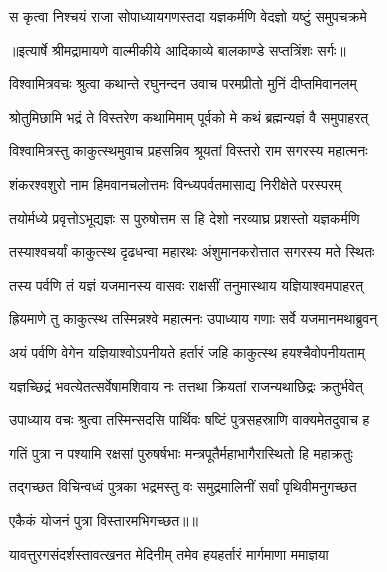 \twolineshloka
{स कृत्वा निश्चयं राजा सोपाध्यायगणस्तदा}
{यज्ञकर्मणि वेदज्ञो यष्टुं समुपचक्रमे} %


{॥इत्यार्षे श्रीमद्रामायणे वाल्मीकीये आदिकाव्ये बालकाण्डे सप्तत्रिंशः सर्गः॥}


\twolineshloka
{विश्वामित्रवचः श्रुत्वा कथान्ते रघुनन्दन}
{उवाच परमप्रीतो मुनिं दीप्तमिवानलम्} %

\twolineshloka
{श्रोतुमिछामि भद्रं ते विस्तरेण कथामिमाम्}
{पूर्वको मे कथं ब्रह्मन्यज्ञं वै समुपाहरत्} %

\twolineshloka
{विश्वामित्रस्तु काकुत्स्थमुवाच प्रहसन्निव}
{श्रूयतां विस्तरो राम सगरस्य महात्मनः} %

\twolineshloka
{शंकरश्वशुरो नाम हिमवानचलोत्तमः}
{विन्ध्यपर्वतमासाद्य निरीक्षेते परस्परम्} %

\twolineshloka
{तयोर्मध्ये प्रवृत्तोऽभूद्यज्ञः स पुरुषोत्तम}
{स हि देशो नरव्याघ्र प्रशस्तो यज्ञकर्मणि} %

\twolineshloka
{तस्याश्वचर्यां काकुत्स्थ दृढधन्वा महारथः}
{अंशुमानकरोत्तात सगरस्य मते स्थितः} %

\twolineshloka
{तस्य पर्वणि तं यज्ञं यजमानस्य वासवः}
{राक्षसीं तनुमास्थाय यज्ञियाश्वमपाहरत्} %

\twolineshloka
{ह्रियमाणे तु काकुत्स्थ तस्मिन्नश्वे महात्मनः}
{उपाध्याय गणाः सर्वे यजमानमथाब्रुवन्} %

\twolineshloka
{अयं पर्वणि वेगेन यज्ञियाश्वोऽपनीयते}
{हर्तारं जहि काकुत्स्थ हयश्चैवोपनीयताम्} %

\twolineshloka
{यज्ञच्छिद्रं भवत्येतत्सर्वेषामशिवाय नः}
{तत्तथा क्रियतां राजन्यथाछिद्रः क्रतुर्भवेत्} %

\twolineshloka
{उपाध्याय वचः श्रुत्वा तस्मिन्सदसि पार्थिवः}
{षष्टिं पुत्रसहस्राणि वाक्यमेतदुवाच ह} %

\twolineshloka
{गतिं पुत्रा न पश्यामि रक्षसां पुरुषर्षभाः}
{मन्त्रपूतैर्महाभागैरास्थितो हि महाक्रतुः} %

\twolineshloka
{तद्गच्छत विचिन्वध्वं पुत्रका भद्रमस्तु वः}
{समुद्रमालिनीं सर्वां पृथिवीमनुगच्छत} %

{एकैकं योजनं पुत्रा विस्तारमभिगच्छत॥॥} %

\addtocounter{shlokacount}{1}

\twolineshloka
{यावत्तुरगसंदर्शस्तावत्खनत मेदिनीम्}
{तमेव हयहर्तारं मार्गमाणा ममाज्ञया} %

